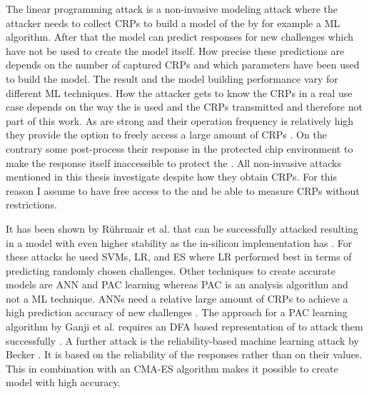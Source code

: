 The linear programming attack is a non-invasive modeling attack where the attacker needs to collect \acp{CRP} to build a model of the \puf by for example a \ac{ML} algorithm.
After that the model can predict responses for new challenges which have not be used to create the model itself.
How precise these predictions are depends on the number of captured \acp{CRP} and which parameters have been used to build the model.
The result and the model building performance vary for different \ac{ML} techniques.
How the attacker gets to know the \acp{CRP} in a real use case depends on the way the \puf is used and the \acp{CRP} transmitted and therefore not part of this work.
As \apufs are strong \pufs and their operation frequency is relatively high they provide the option to freely access a large amount of \acp{CRP} \cite{Ruhrmair2010ModelingFunctions}.
On the contrary some \pufs post-process their response in the protected chip environment to make the \puf response itself inaccessible to protect the \puf \cite{Suh2007PhysicalGeneration, Gassend2004IdentificationCircuits}.
All non-invasive attacks mentioned in this thesis investigate \pufs despite how they obtain \acp{CRP}.
For this reason I assume to have free access to the \puf and be able to measure \acp{CRP} without restrictions.

It has been shown by Rührmair et al. that \apufs can be successfully attacked resulting in a model with even higher stability as the \apuf in-silicon implementation has \cite{Ruhrmair2010ModelingFunctions}.
For these attacks he used \acp{SVM}, \ac{LR}, and \ac{ES} where \ac{LR} performed best in terms of predicting randomly chosen challenges.
Other techniques to create accurate \apuf models are \ac{ANN} and \ac{PAC} learning whereas \ac{PAC} is an analysis algorithm and not a \ac{ML} technique. 
\acp{ANN} need a relative large amount of \acp{CRP} to achieve a high prediction accuracy of new challenges \cite{Hospodar2012MachineUsability}.
The approach for a \ac{PAC} learning algorithm by Ganji et al. requires an \ac{DFA} based representation of \apufs to attack them successfully \cite{Ganji2016PACPUFs}.
A further attack is the reliability-based machine learning attack by Becker \cite{Becker2015ThePUFs}.
It is based on the reliability of the \puf responses rather than on their values. 
This in combination with an \ac{CMA-ES} algorithm makes it possible to create \apuf model with high accuracy.

